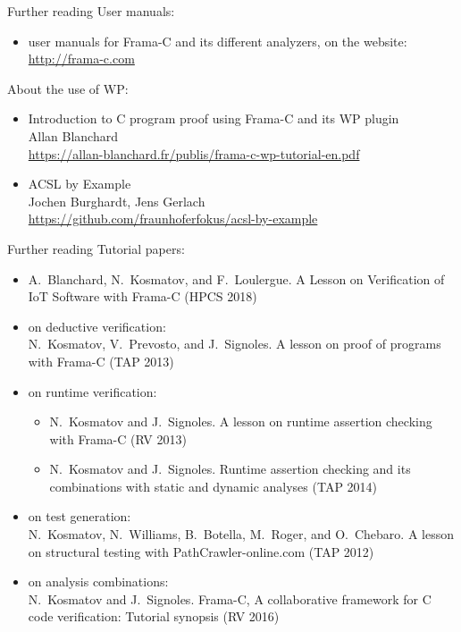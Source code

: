 
\begin{frame}{Further reading}
  User manuals:
  \begin{itemize}
  \item user manuals for Frama-C and its different analyzers, on the website:\\
    {\small \url{http://frama-c.com}}   
  \end{itemize}
\medskip
  About the use of WP:
  \begin{itemize}
  \item Introduction to C program proof using Frama-C and its WP plugin\\
    Allan Blanchard\\
    {\small \url{https://allan-blanchard.fr/publis/frama-c-wp-tutorial-en.pdf}}
  \item ACSL by Example\\
    Jochen Burghardt, Jens Gerlach\\
    {\small \url{https://github.com/fraunhoferfokus/acsl-by-example}}
  \end{itemize}
\end{frame}

\begin{frame}{Further reading}
  Tutorial papers:
  \begin{small}
  \begin{itemize}
  \item %
  A.~Blanchard, N.~Kosmatov, and F.~Loulergue. A Lesson on Verification of IoT Software with Frama-C (HPCS 2018)
  	
  \item on deductive verification:\\
    N.~Kosmatov, V.~Prevosto, and J.~Signoles. A lesson on proof of programs with Frama-C (TAP 2013)
  \item on runtime verification:
    \begin{itemize}
    \item N.~Kosmatov and J.~Signoles. A lesson on runtime assertion checking with Frama-C (RV 2013)
    \item N.~Kosmatov and J.~Signoles. Runtime assertion checking and its combinations with static and dynamic analyses (TAP 2014)
    \end{itemize}
  \item on test generation:\\
    N.~Kosmatov, N.~Williams, B.~Botella, M.~Roger, and O.~Chebaro. A lesson on  structural testing with PathCrawler-online.com (TAP 2012)
  \item on analysis combinations:\\
    N.~Kosmatov and J.~Signoles. Frama-C, A collaborative framework for C code verification: Tutorial synopsis (RV 2016)
  \end{itemize}
  \end{small}
\end{frame}


